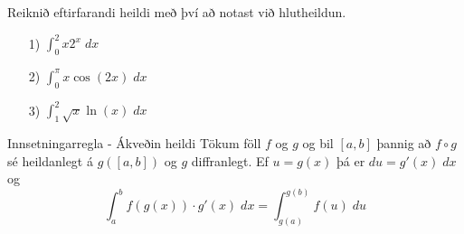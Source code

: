 \begin{æd}
Reiknið eftirfarandi heildi með því að notast við hlutheildun.
\begin{itemize}
\item[1)] $\displaystyle \int_{0}^{2} x2^{x} \; dx$

\item[2)] $\displaystyle \int_{0}^{\pi} x\cos(2x) \; dx$

\item[3)] $\displaystyle \int_{1}^{2} \sqrt{x}\ln(x) \; dx$
\end{itemize}
\end{æd}

\begin{regla}{Innsetningarregla - Ákveðin heildi}
Tökum föll $f$ og $g$ og bil $[a,b]$ þannig að $f\circ g$ sé heildanlegt á $g\left([a,b]\right)$ og $g$ diffranlegt. Ef $u = g(x)$ þá er $du = g'(x)\;dx$ og
$$
\int_{a}^{b} f(g(x))\cdot g'(x)\;dx = \int_{g(a)}^{g(b)} f(u)\;du
$$
\end{regla}

